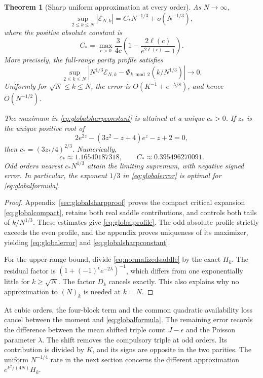 \documentclass[11pt]{article}
\newtheorem{theorem}{Theorem}[section]
\theoremstyle{definition}
\theoremstyle{remark}
\newcommand{\1}{\mathbf 1}
\begin{document}
\begin{theorem}[Sharp uniform approximation at every order]\label{thm:global}
As $N\to\infty$,
\begin{equation}\label{eq:globalerror}
\sup_{2\le k\le N}|\mathcal E_{N,k}|
=C_*N^{-1/3}+o(N^{-1/3}),
\end{equation}
where the positive absolute constant is
\begin{equation}\label{eq:globalsharpconstant}
C_*=\max_{c>0}\frac3{4c}
\left(1-\frac{2\ell(c)}{e^{2\ell(c)}-1}\right).
\end{equation}
More precisely, the full-range parity profile satisfies
\begin{equation}\label{eq:globalprofile}
\sup_{2\le k\le N}
\left|N^{1/3}\mathcal E_{N,k}
-\Phi_{k\bmod2}(k/N^{1/3})\right|\longrightarrow0.
\end{equation}
Uniformly for $\sqrt N\le k\le N$, the error is
$O(K^{-1}+e^{-\lambda/8})$, and hence $O(N^{-1/2})$.

The maximum in \eqref{eq:globalsharpconstant} is attained at a unique $c_*>0$. If $z_*$ is the unique positive root of
\begin{equation}\label{eq:globalmaxequation}
2e^{2z}-(3z^2-z+4)e^z-z+2=0,
\end{equation}
then $c_*=(3z_*/4)^{2/3}$. Numerically,
\[
c_*\approx1.16540187318,\qquad C_*\approx0.395496270091.
\]
Odd orders nearest $c_*N^{1/3}$ attain the limiting supremum, with negative signed error. In particular, the exponent $1/3$ in \eqref{eq:globalerror} is optimal for \eqref{eq:globalformula}.
\end{theorem}
\begin{proof}
Appendix~\ref{sec:globalsharpproof} proves the compact critical expansion \eqref{eq:globalcompact}, retains both real saddle contributions, and controls both tails of $k/N^{1/3}$. These estimates give \eqref{eq:globalprofile}. The odd absolute profile strictly exceeds the even profile, and the appendix proves uniqueness of its maximizer, yielding \eqref{eq:globalerror} and \eqref{eq:globalsharpconstant}.

For the upper-range bound, divide \eqref{eq:normalizedsaddle} by the exact $H_k$. The residual factor is $(1+(-1)^\epsilon e^{-2\lambda})^{-1}$, which differs from one exponentially little for $k\ge\sqrt N$. The factor $D_k$ cancels exactly. This also explains why no approximation to $(N)_k$ is needed at $k=N$.
\end{proof}

At cubic orders, the four-block term and the common quadratic availability loss cancel between the moment and \eqref{eq:globalformula}. The remaining error records the difference between the mean shifted triple count $J-\epsilon$ and the Poisson parameter $\lambda$. The shift removes the compulsory triple at odd orders. Its contribution is divided by $K$, and its signs are opposite in the two parities. The uniform $N^{-1/4}$ rate in the next section concerns the different approximation $e^{k^2/(4N)}H_k$.
\end{document}
